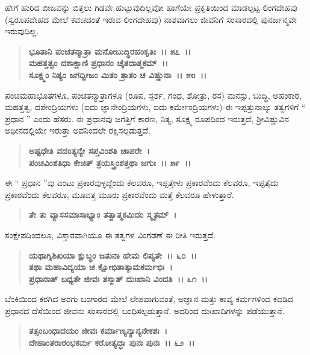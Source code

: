 ಹೇಗೆ ಹುರಿದ ಬೀಜವನ್ನು ಬಿತ್ತಲು ಗಿಡವೇ ಹುಟ್ಟುವುದಿಲ್ಲವೋ ಹಾಗೆಯೇ ಪ್ರಕೃತಿಯಿಂದ ಮಾಡಲ್ಪಟ್ಟ ಲಿಂಗದೇಹವು (ಸ್ವರೂಪದೇಹದ ಮೇಲೆ ಕವಚದಂತೆ ಇರುವ ಲಿಂಗದೇಹವು) ನಾಶವಾಗಲು ಜೀವನಿಗೆ ಸಂಸಾರದಲ್ಲಿ ಪುನರ್ಜನ್ಮವೇ ಇರುವುದಿಲ್ಲ.

\begin{verse}
\textbf{ಭೂತಾನಿ ಪಂಚತನ್ಮಾತ್ರಾ ಮನೋಬುದ್ಧಿರಹಂಕೃತಿಃ~।। ೫೭~।।}\\\textbf{ಮಹತ್ತತ್ವಂ ದಶಾಕ್ಷಾಣಿ ಪ್ರಧಾನಂ ಚೈತದಾತ್ಮಕಮ್~।। }\\\textbf{ಸೂಕ್ಷ್ಮಂ ನಿತ್ಯಂ ಜಗದ್ಬೀಜಂ ಮಿತಂ ತ್ರಾತಂ ಚ ವಿಷ್ಣುನಾ~।। ೫೮~।।}
\end{verse}

ಪಂಚಮಹಾಭೂತಗಳೂ, ಪಂಚತನ್ಮಾತ್ರಾಗಳೂ (ರೂಪ, ಸ್ಪರ್ಶ, ಗಂಧ, ಶೋತ್ರು, ರಸ) ಮನಸ್ಸು, ಬುದ್ಧಿ, ಅಹಂಕಾರ, ಮಹತ್ತತ್ವ, ದಶೇಂದ್ರಿಯಗಳು (ಐದು ಜ್ಞಾನೇಂದ್ರಿಯಗಳು, ಐದು ಕರ್ಮೇಂದ್ರಿಯಗಳು)-ಈ ಇಪ್ಪತ್ತುನಾಲ್ಕು ತತ್ವಗಳಿಗೆ “ ಪ್ರಧಾನ ” ಎಂದು ಹೆಸರು. ಈ ಪ್ರಧಾನವು ಜಗತ್ತಿಗೆ ಕಾರಣ, ನಿತ್ಯ, ಸೂಕ್ಷ್ಮ ರೂಪದಿಂದ ಇರುತ್ತದೆ, ಶ‍್ರೀವಿಷ್ಣುವಿನ ಅಧೀನದಲ್ಲಿಯೇ ಇರುತ್ತಾ ಅವನಿಂದಲೇ ರಕ್ಷಿಸಲ್ಪಡುತ್ತದೆ.

\begin{verse}
\textbf{ಅಷ್ಟಧೇತಿ ವದಂತ್ಯನ್ಯೇ ಸಪ್ತವಿಂಶತಿ ಚಾಪರೇ~।}\\\textbf{ಪಂಚವಿಂಶತಿಧಾ ಕೇಚಿತ್ ತ್ರಯಸ್ತ್ರಿಂಶತ್ತಥಾ ಜಗುಃ~।। ೫೯~।।}
\end{verse}

ಈ “ ಪ್ರಧಾನ ”ವು ಎಂಟು ಪ್ರಕಾರವುಳ್ಳದ್ದೆಂದು ಕೆಲವರೂ, ಇಪ್ಪತ್ತೇಳು ಪ್ರಕಾರವೆಂದು ಕೆಲವರೂ, ಇಪ್ಪತೈದು ಪ್ರಕಾರವೆಂದು ಕೆಲವರೂ, ಮೂವತ್ತ ಮೂರು ಪ್ರಕಾರವೆಂದು ಮತ್ತೆ ಕೆಲವರೂ ಹೇಳುತ್ತಾರೆ.

\begin{verse}
\textbf{ತೇ ತು ವ್ಯಾಸಸಮಾಸಾಭ್ಯಾಂ ತತ್ವಾತ್ಮಕಮಿದಂ ಸ್ಮೃತಮ್~।}
\end{verse}

ಸಂಕ್ಷೇಪದಿಂದಲೂ, ವಿಸ್ತಾರವಾಗಿಯೂ ಈ ತತ್ವಗಳ ವಿಂಗಡಣೆ ಈ ರೀತಿ ಇರುತ್ತದೆ.

\begin{verse}
\textbf{ಯಥಾಗ್ನಿಶಿಖಯಾ ಕ್ಷುಬ್ಧಂ ಜತುನಾ ಹೇಮ ಲಿಪ್ಯತೇ~।। ೬೦~।।}\\\textbf{ತಥಾ ಮಹಾವಿದ್ಯಯಾ ಚ ಕ್ಷೋಭಿತಾತ್ಕಾಮಕರ್ಮಭಿಃ~।}\\\textbf{ಪ್ರಧಾನಾತ್ ಬಧ್ಯತೇ ಜೀವಃ ತಸ್ಮಾತ್ ದುಃಖಾನಿ ವಿಂದತಿ~।। ೬೧~।।}
\end{verse}

ಬೆಂಕಿಯಿಂದ ಕರಗಿದ ಅರಗು ಬಂಗಾರದ ಮೇಲೆ ಲೇಪವಾಗುವಂತೆ, ಅಜ್ಞಾನ ಮತ್ತು ಕಾವ್ಯ ಕರ್ಮಗಳಿಂದ ಕದಡಿದ ಪ್ರಧಾನದ ದೆಸೆಯಿಂದ ಜೀವನು ಸಂಸಾರದಲ್ಲಿ ಬಂಧಿಸಲ್ಪಡು\-ತ್ತಾನೆ. ಅದರಿಂದ ದುಃಖಾದಿಗಳನ್ನು ಪಡೆಯುತ್ತಾನೆ.

\begin{verse}
\textbf{ತತ್ಸಂಬಂಧಾದಯಂ ಜೀವಃ ಕರ್ಮಾಣ್ಯನ್ಯಾನ್ಯನೇಕಶಃ~।}\\\textbf{ದೇಹಾಂತರಾರಂಭಕರ್ಮ ಕರೋತ್ಯದ್ಧಾ ಪುನಃ ಪುನಃ~।। ೬೨~।।}
\end{verse}

